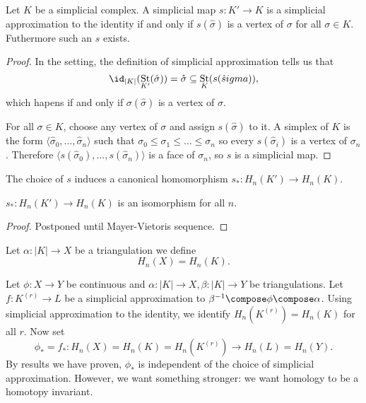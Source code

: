 \documentclass[a4paper]{article}
\newcommand{\interior}{\mathring} %
\DeclareMathOperator{\St}{St} %
\begin{document}
\begin{lemma}
  Let \(K\) be a simplicial complex. A simplicial map \(s: K' \to K\) is a simplicial approximation to the identity if and only if \(s(\hat \sigma)\) is a vertex of \(\sigma\) for all \(\sigma \in K\). Futhermore such an \(s\) exists.
\end{lemma}

\begin{proof}
  In the setting, the definition of simplicial approximation tells us that
  \[
    \id_{|K|} (\St_{K'}(\hat \sigma)) = \interior \sigma \subseteq \St_K(s(\hat sigma)),
  \]
  which hapens if and only if \(\sigma(\hat \sigma)\) is a vertex of \(\sigma\).

  For all \(\sigma \in K\), choose any vertex of \(\sigma\) and assign \(s(\hat \sigma)\) to it. A simplex of \(K\) is the form \(\langle \hat \sigma_0, \dots, \hat \sigma_n \rangle\) such that \(\sigma_0 \leq \sigma_1 \leq \dots \leq \sigma_n\) so every \(s(\hat \sigma_i)\) is a vertex of \(\sigma_n\). Therefore \(\langle s(\hat \sigma_0), \dots, s(\hat \sigma_n) \rangle\) is a face of \(\sigma_n\), so \(s\) is a simplicial map.
\end{proof}

The choice of \(s\) induces a canonical homomorphism \(s_*: H_n(K') \to H_n(K)\).

\begin{proposition}
  \(s_*: H_n(K') \to H_n(K)\) is an isomorphism for all \(n\).
\end{proposition}

\begin{proof}
  Postponed until Mayer-Vietoris sequence.
\end{proof}

\begin{definition}
  Let \(\alpha: |K| \to X\) be a triangulation we define
  \[
    H_n(X) = H_n(K).
  \]
\end{definition}

Let \(\phi: X \to Y\) be continuous and \(\alpha: |K| \to X, \beta: |K| \to Y\) be triangulations. Let \(f: K^{(r)} \to L\) be a simplicial approximation to \(\beta^{-1} \compose \phi \compose \alpha\). Using simplicial approximation to the identity, we identify \(H_n(K^{(r)}) = H_n(K)\) for all \(r\). Now set
\[
  \phi_* = f_*: H_n(X) = H_n(K) = H_n(K^{(r)}) \to H_n(L) = H_n(Y).
\]
By results we have proven, \(\phi_*\) is independent of the choice of simplicial approximation. However, we want something stronger: we want homology to be a homotopy invariant.
\end{document}
